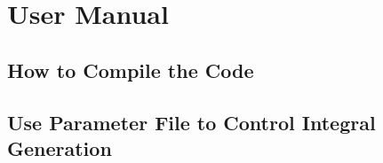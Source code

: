 %
% 
%
\chapter{User Manual}

\section{How to Compile the Code}

\section{Use Parameter File to Control Integral Generation}